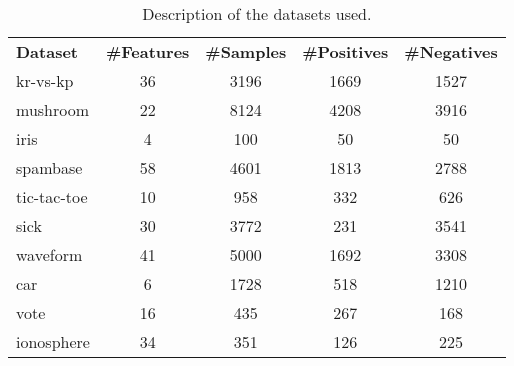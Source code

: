 \begin{table}[htbp]
\centering
\caption[Description of the Datasets Used]{Description of the datasets used.}\label{tab:crowd.Table.1.Datasets}
\begin{tabulary}{\linewidth}{LCCCC}
    \toprule
    \textbf{Dataset} & \textbf{\#Features} & \textbf{\#Samples} & \textbf{\#Positives} & \textbf{\#Negatives} \\
    kr-vs-kp    & 36 & 3196 & 1669 & 1527 \\
    mushroom    & 22 & 8124 & 4208 & 3916 \\
    iris        & 4  & 100  & 50   & 50   \\
    spambase    & 58 & 4601 & 1813 & 2788 \\
    tic-tac-toe & 10 & 958  & 332  & 626  \\
    sick        & 30 & 3772 & 231  & 3541 \\
    waveform    & 41 & 5000 & 1692 & 3308 \\
    car         & 6  & 1728 & 518  & 1210 \\
    vote        & 16 & 435  & 267  & 168  \\
    ionosphere  & 34 & 351  & 126  & 225  \\
    \bottomrule
\end{tabulary}
\end{table}

